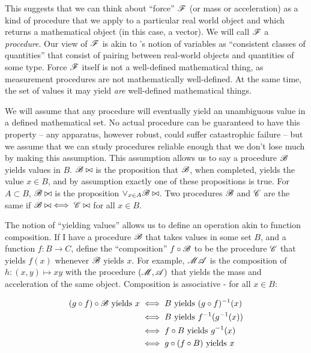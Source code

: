 This suggests that we can think about ``force'' $\proc{F}$ (or mass or acceleration) as a kind of procedure that we apply to a particular real world object and which returns a mathematical object (in this case, a vector). We will call $\proc{F}$ a \emph{procedure}. Our view of $\proc{F}$ is akin to \citet{menger_random_2003}'s notion of variables as ``consistent classes of quantities'' that consist of pairing between real-world objects and quantities of some type. Force $\proc{F}$ itself is not a well-defined mathematical thing, as measurement procedures are not mathematically well-defined. At the same time, the set of values it may yield \emph{are} well-defined mathematical things.

We will assume that any procedure will eventually yield an unambiguous value in a defined mathematical set. No actual procedure can be guaranteed to have this property -- any apparatus, however robust, could suffer catastrophic failure -- but we assume that we can study procedures reliable enough that we don't lose much by making this assumption. This assumption allows us to say a procedure $\proc{B}$ yields values in $B$. $\proc{B}\yields x$ is the proposition that $\proc{B}$, when completed, yields the value $x\in B$, and by assumption exactly one of these propositions is true. For $A\subset B$, $\proc{B}\yields A$ is the proposition $\lor_{x\in A} \proc{B}\yields x$. Two procedures $\proc{B}$ and $\proc{C}$ are the same if $\proc{B}\yields x\iff \proc{C}\yields x$ for all $x\in B$. 

The notion of ``yielding values'' allows us to define an operation akin to function composition. If I have a procedure $\proc{B}$ that takes values in some set $B$, and a function $f:B\to C$, define the ``composition'' $f\circ \proc{B}$ to be the procedure $\proc{C}$ that yields $f(x)$ whenever $\proc{B}$ yields $x$. For example, $\proc{MA}$ is the composition of $h:(x,y)\mapsto xy$ with the procedure $(\proc{M},\proc{A})$ that yields the mass and acceleration of the same object. Composition is associative - for all $x\in B$: 

\begin{align}
	(g\circ f)\circ\proc{B}\text{ yields } x &\iff B\text{ yields } (g\circ f)^{-1}(x) \\
	&\iff B\text{ yields } f^{-1}(g^{-1}(x))\\
	&\iff f\circ B \text{ yields } g^{-1}(x)\\
	&\iff g\circ(f\circ B)\text{ yields } x
\end{align}


